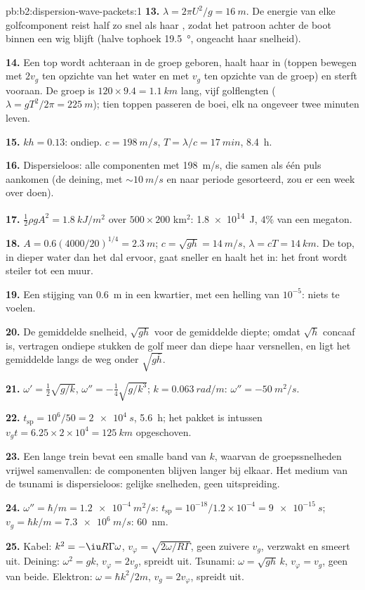 \begin{solution}{pb:b2:dispersion-wave-packets:1}
\textbf{13.} $\lambda = 2\pi U^2/g = \qty{16}{m}$. De energie van elke
golfcomponent reist half zo snel als haar , zodat het patroon
achter de boot binnen een wig blijft (halve tophoek \qty{19.5}{\degree},
ongeacht haar snelheid).

\textbf{14.} Een top wordt achteraan in de groep geboren, haalt haar in
(toppen bewegen met $2v_g$ ten opzichte van het water en met $v_g$ ten
opzichte van de groep) en sterft vooraan. De groep is
$120 \times 9.4 = \qty{1.1}{km}$ lang, vijf golflengten
($\lambda = gT^2/2\pi = \qty{225}{m}$); tien toppen passeren de boei, elk na
ongeveer twee minuten leven.

\textbf{15.} $kh = 0.13$: ondiep. $c = \qty{198}{m/s}$,
$T = \lambda/c = \qty{17}{min}$, \qty{8.4}{h}.

\textbf{16.} Dispersieloos: alle componenten met \qty{198}{m/s}, die samen
als één puls aankomen (de deining, met $\sim\qty{10}{m/s}$ en naar periode
gesorteerd, zou er een week over doen).

\textbf{17.} $\tfrac12\rho gA^2 = \qty{1.8}{kJ/m^2}$ over $500 \times 200$
km$^2$: \qty{1.8e14}{J}, $4\%$ van een megaton.

\textbf{18.} $A = 0.6(4000/20)^{1/4} = \qty{2.3}{m}$;
$c = \sqrt{gh} = \qty{14}{m/s}$, $\lambda =
cT = \qty{14}{km}$. De top, in
dieper water dan het dal ervoor, gaat sneller en haalt het in: het front
wordt steiler tot een muur.

\textbf{19.} Een stijging van \qty{0.6}{m} in een kwartier, met een helling
van $10^{-5}$: niets te voelen.

\textbf{20.} De gemiddelde snelheid, $\sqrt{gh}$ voor de gemiddelde diepte;
omdat $\sqrt h$ concaaf is, vertragen ondiepe stukken de golf meer dan diepe
haar versnellen, en ligt het gemiddelde langs de weg onder $\sqrt{g\bar h}$.

\textbf{21.} $\omega' = \tfrac12\sqrt{g/k}$,
$\omega'' = -\tfrac14\sqrt{g/k^3}$; $k = \qty{0.063}{rad/m}$:
$\omega'' = \qty{-50}{m^2/s}$.

\textbf{22.} $t_{\text{sp}} = 10^6/50 = \qty{2e4}{s}$, \qty{5.6}{h}; het
pakket is intussen $v_gt = 6.25 \times 2 \times 10^4 = \qty{125}{km}$
opgeschoven.

\textbf{23.} Een lange trein bevat een smalle band van $k$, waarvan de
groepssnelheden vrijwel samenvallen: de componenten blijven langer bij
elkaar. Het medium van de tsunami is dispersieloos: gelijke snelheden, geen
uitspreiding.

\textbf{24.} $\omega'' = \hbar/m = \qty{1.2e-4}{m^2/s}$:
$t_{\text{sp}} = 10^{-18}/1.2 \times
10^{-4} = \qty{9e-15}{s}$;
$v_g = \hbar k/m = \qty{7.3e6}{m/s}$: \qty{60}{nm}.

\textbf{25.} Kabel: $k^2 = -\iu R\Gamma\omega$,
$v_\varphi = \sqrt{2\omega/R\Gamma}$, geen zuivere $v_g$, verzwakt en smeert
uit. Deining: $\omega^2 = gk$, $v_\varphi = 2v_g$, spreidt uit. Tsunami:
$\omega = \sqrt{gh}\,k$, $v_\varphi = v_g$, geen van beide. Elektron:
$\omega = \hbar k^2/2m$, $v_g = 2v_\varphi$, spreidt uit.
\end{solution}
